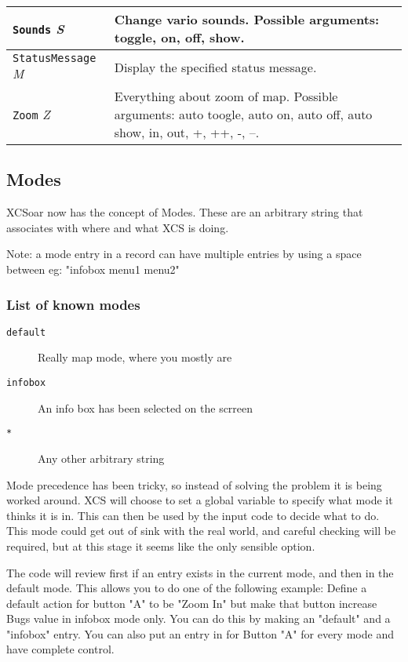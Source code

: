 {\begin{tabular}{l|p{7cm}}
\hline

\texttt{Sounds} \emph{S} & Change vario sounds.  Possible arguments:
toggle, on, off, show. \\

\hline

\texttt{StatusMessage} \emph{M} & Display the specified status
message. \\

\hline

\texttt{Zoom} \emph{Z} & Everything about zoom of map.  Possible
arguments: auto toogle, auto on, auto off, auto show, in, out, +, ++,
-, --. \\

\end{tabular}}

\subsection{Modes}

XCSoar now has the concept of Modes. These are an arbitrary
string that associates with where and what XCS is doing.

Note: a mode entry in a record can have multiple entries by using a space
between eg: "infobox menu1 menu2"

\subsubsection{List of known modes}

\begin{description}
\item[\texttt{default}] Really map mode, where you mostly are
\item[\texttt{infobox}] An info box has been selected on the scrreen
\item[\texttt{*}] Any other arbitrary string
\end{description}

Mode precedence has been tricky, so instead of solving the problem
it is being worked around. XCS will choose to set a global variable
to specify what mode it thinks it is in. This can then be used by the
input code to decide what to do. This mode could get out of sink
with the real world, and careful checking will be required, but at
this stage it seems like the only sensible option.

The code will review first if an entry exists in the current mode, and
then in the default mode. This allows you to do one of the following
example: Define a default action for button "A" to be "Zoom In" but
make that button increase Bugs value in infobox mode only. You can do
this by making an "default" and a "infobox" entry. You can also put an entry
in for Button "A" for every mode and have complete control.

